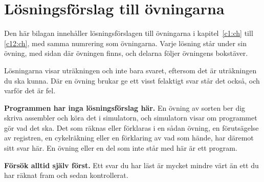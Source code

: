 
\chapter{Lösningsförslag till övningarna}
\label{app:answers}

Den här bilagan innehåller lösningsförslagen till övningarna i kapitel~\ref{c1:ch} till
\ref{c12:ch}, med samma numrering som övningarna. Varje lösning står under sin övning, med sidan
där övningen finns, och delarna följer övningens bokstäver.

Lösningarna visar uträkningen och inte bara svaret, eftersom det är uträkningen du ska kunna. Där
en övning brukar ge ett visst felaktigt svar står det också, och varför det är fel.

\textbf{Programmen har inga lösningsförslag här.} En övning av sorten  ber dig skriva
assembler och köra det i simulatorn, och simulatorn visar om programmet gör vad det ska. Det som
räknas eller förklaras i en sådan övning, en förutsägelse av registren, en cykelräkning eller en
förklaring av vad som hände, har däremot sitt svar här. En övning eller en del som inte står med
här är ett program.

\textbf{Försök alltid själv först.} Ett svar du har läst är mycket mindre värt än ett du har räknat
fram och sedan kontrollerat.

